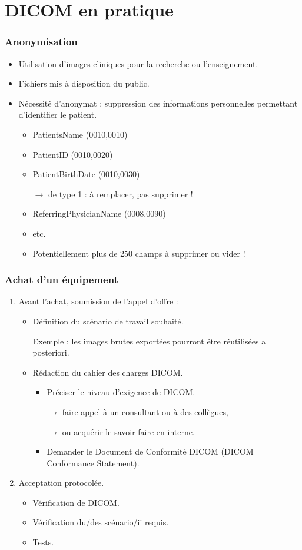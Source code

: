 \section{DICOM en pratique}

\frame
{
	\frametitle{Anonymisation}
	\begin{itemize}
		\item Utilisation d'images cliniques pour la recherche ou l'enseignement.
		\item Fichiers mis \`a disposition du public.
		\item N\'ecessit\'e d'anonymat : suppression des informations personnelles permettant d'identifier le patient.
		\begin{itemize}
			\item PatientsName (0010,0010)
			\item PatientID (0010,0020)
			\item PatientBirthDate (0010,0030)
			
			$\rightarrow$ de type 1 : \`a remplacer, pas supprimer !
			\item ReferringPhysicianName (0008,0090)
			\item etc.
			\item Potentiellement plus de 250 champs \`a supprimer ou vider !
		\end{itemize}
	\end{itemize}
}

\frame
{
	\frametitle{Achat d'un \'equipement}
	\begin{enumerate}
		\item Avant l'achat, soumission de l'appel d'offre :
		\begin{itemize}
			\item D\'efinition du sc\'enario de travail souhait\'e.
			
			Exemple : les images brutes export\'ees pourront \^etre r\'eutilis\'ees a posteriori.
			\item R\'edaction du cahier des charges DICOM.
			\begin{itemize}
				\item Pr\'eciser le niveau d'exigence de DICOM.
				
				$\rightarrow$ faire appel \`a un consultant ou \`a des coll\`egues,
				
				$\rightarrow$ ou acqu\'erir le savoir-faire en interne.
				\item Demander le Document de Conformit\'e DICOM (DICOM Conformance Statement).
			\end{itemize}
		\end{itemize}
		\item Acceptation protocol\'ee.
		\begin{itemize}
			\item V\'erification de DICOM.
			\item V\'erification du/des sc\'enario/ii requis.
			\item Tests.
		\end{itemize}
	\end{enumerate}
}

